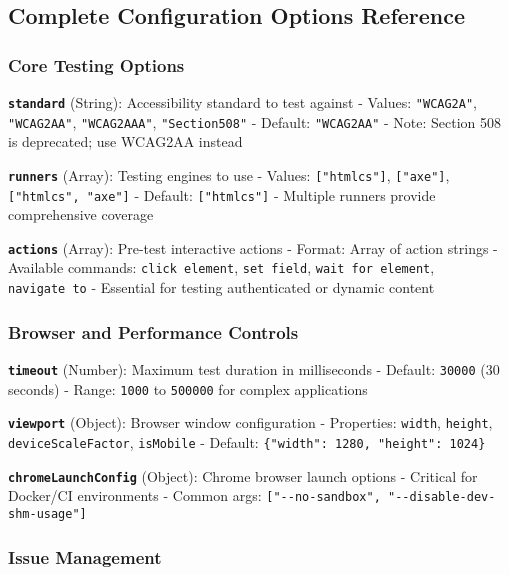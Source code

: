 \subsection{Complete Configuration Options
Reference}\label{complete-configuration-options-reference}

\subsubsection{Core Testing Options}\label{core-testing-options}

\textbf{\texttt{standard}} (String): Accessibility standard to test
against - Values: \texttt{"WCAG2A"}, \texttt{"WCAG2AA"},
\texttt{"WCAG2AAA"}, \texttt{"Section508"} - Default: \texttt{"WCAG2AA"}
- Note: Section 508 is deprecated; use WCAG2AA instead

\textbf{\texttt{runners}} (Array): Testing engines to use - Values:
\texttt{{[}"htmlcs"{]}}, \texttt{{[}"axe"{]}},
\texttt{{[}"htmlcs",\ "axe"{]}} - Default: \texttt{{[}"htmlcs"{]}} -
Multiple runners provide comprehensive coverage

\textbf{\texttt{actions}} (Array): Pre-test interactive actions -
Format: Array of action strings - Available commands:
\texttt{click\ element}, \texttt{set\ field},
\texttt{wait\ for\ element}, \texttt{navigate\ to} - Essential for
testing authenticated or dynamic content

\subsubsection{Browser and Performance
Controls}\label{browser-and-performance-controls}

\textbf{\texttt{timeout}} (Number): Maximum test duration in
milliseconds - Default: \texttt{30000} (30 seconds) - Range:
\texttt{1000} to \texttt{500000} for complex applications

\textbf{\texttt{viewport}} (Object): Browser window configuration -
Properties: \texttt{width}, \texttt{height}, \texttt{deviceScaleFactor},
\texttt{isMobile} - Default:
\texttt{\{"width":\ 1280,\ "height":\ 1024\}}

\textbf{\texttt{chromeLaunchConfig}} (Object): Chrome browser launch
options - Critical for Docker/CI environments - Common args:
\texttt{{[}"-\/-no-sandbox",\ "-\/-disable-dev-shm-usage"{]}}

\subsubsection{Issue Management}\label{issue-management}

